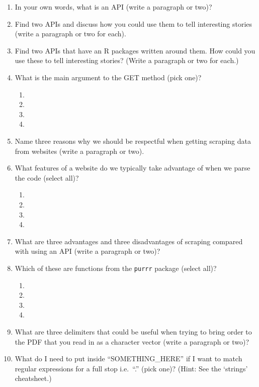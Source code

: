 \documentclass[
]{book}
\providecommand{\tightlist}{%
  \setlength{\itemsep}{0pt}\setlength{\parskip}{0pt}}
\begin{document}
\begin{enumerate}
\def\labelenumi{\arabic{enumi}.}
\tightlist
\item
  In your own words, what is an API (write a paragraph or two)?
\item
  Find two APIs and discuss how you could use them to tell interesting stories (write a paragraph or two for each).
\item
  Find two APIs that have an R packages written around them. How could you use these to tell interesting stories? (Write a paragraph or two for each.)
\item
  What is the main argument to the GET method (pick one)?

  \begin{enumerate}
  \def\labelenumii{\alph{enumii}.}
  \item
  \item
  \item
  \item
  \end{enumerate}
\item
  Name three reasons why we should be respectful when getting scraping data from websites (write a paragraph or two).
\item
  What features of a website do we typically take advantage of when we parse the code (select all)?

  \begin{enumerate}
  \def\labelenumii{\alph{enumii}.}
  \item
  \item
  \item
  \item
  \end{enumerate}
\item
  What are three advantages and three disadvantages of scraping compared with using an API (write a paragraph or two)?
\item
  Which of these are functions from the \texttt{purrr} package (select all)?

  \begin{enumerate}
  \def\labelenumii{\alph{enumii}.}
  \item
  \item
  \item
  \item
  \end{enumerate}
\item
  What are three delimiters that could be useful when trying to bring order to the PDF that you read in as a character vector (write a paragraph or two)?
\item
  What do I need to put inside ``SOMETHING\_HERE'' if I want to match regular expressions for a full stop i.e.~``.'' (pick one)? (Hint: See the `strings' cheatsheet.)


\end{enumerate}
\end{document}

